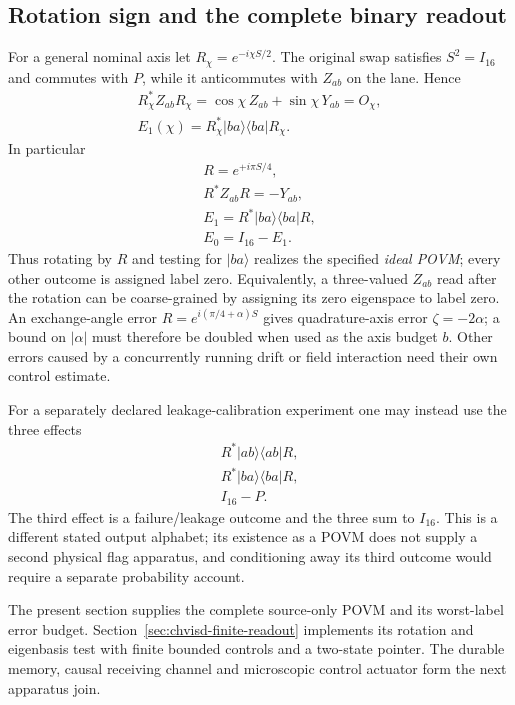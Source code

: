 \subsection{Rotation sign and the complete binary readout}

For a general nominal axis let $R_\chi=e^{-i\chi S/2}$. The original
swap satisfies $S^2=I_{16}$ and commutes with $P$, while it anticommutes
with $Z_{ab}$ on the lane. Hence
\begin{equation}
\begin{gathered}
R_\chi^*Z_{ab}R_\chi
   =\cos\chi\,Z_{ab}+\sin\chi\,Y_{ab}=O_\chi,
 \\
 E_1(\chi)=R_\chi^*|ba\rangle\langle ba|R_\chi.
\end{gathered}
\label{eq:chvi-decoder-rotation}
\end{equation}
In particular
\begin{equation}
\begin{gathered}
R=e^{+i\pi S/4},\\
 R^*Z_{ab}R=-Y_{ab},\\
 E_1=R^*|ba\rangle\langle ba|R,\\
 E_0=I_{16}-E_1.
\end{gathered}
\label{eq:chvi-decoder-fixed-readout}
\end{equation}
Thus rotating by $R$ and testing for $|ba\rangle$ realizes the specified
\emph{ideal POVM}; every other outcome is assigned label zero.
Equivalently, a three-valued $Z_{ab}$ read after the rotation can be
coarse-grained by assigning its zero eigenspace to label zero.
An exchange-angle error $R=e^{i(\pi/4+\alpha)S}$ gives quadrature-axis
error $\zeta=-2\alpha$; a bound on $|\alpha|$ must therefore be doubled
when used as the axis budget $b$. Other errors caused by a concurrently
running drift or field interaction need their own control estimate.

For a separately declared leakage-calibration experiment one may instead
use the three effects
\begin{equation}
\begin{gathered}
R^*|ab\rangle\langle ab|R,\\
 R^*|ba\rangle\langle ba|R,\\
 I_{16}-P.
\end{gathered}
\end{equation}
The third effect is a failure/leakage outcome and the three sum to
$I_{16}$. This is a different stated output alphabet; its existence as
a POVM does not supply a second physical flag apparatus, and conditioning
away its third outcome would require a separate probability account.

The present section supplies the complete source-only POVM and its
worst-label error budget. Section~\ref{sec:chvisd-finite-readout} implements
its rotation and eigenbasis test with finite bounded controls and a
two-state pointer. The durable memory, causal receiving channel and
microscopic control actuator form the next apparatus join.

